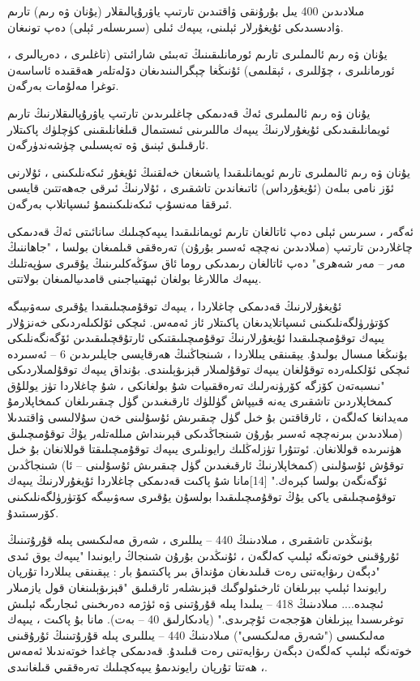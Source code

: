 \documentclass[a4paper]{article}
\begin{document}
مىلادىدىن 400 يىل بۇرۇنقى ۋاقتىدىن تارتىپ ياۋرۇپالىقلار (يۇنان ۋە رىم) تارىم ۋادىسىدىكى ئۇيغۇرلار ئېلىنى، يىپەك ئىلى (سىرىسلەر ئېلى) دەپ تونىغان.

يۇنان ۋە رىم ئالىملىرى تارىم ئورمانلىقىنىڭ تەبىئى شارائىتى (تاغلىرى ، دەريالىرى ، ئورمانلىرى ، چۆللىرى ، ئېقلىمى) ئۇنىڭغا چېگرالىنىدىغان دۆلەتلەر ھەققىدە ئاساسەن توغرا مەلۇمات بەرگەن.

يۇنان ۋە رىم ئالىملىرى ئەڭ قەدىمكى چاغلىرىدىن تارتىپ ياۋرۇپالىقلارنىڭ تارىم ئويمانلىقىدىكى ئۇيغۇرلارنىڭ يىپەك ماللىرىنى ئىستىمال قىلغانلىقىنى كۈچلۈك پاكىتلار ئارقىلىق ئېنىق ۋە تەپسىلىي چۈشەندۈرگەن.

يۇنان ۋە رىم ئالىملىرى تارىم ئويمانلىقىدا ياشىغان خەلقنىڭ ئۇيغۇر ئىكەنلىكىنى ، ئۇلارنى ئۆز نامى بىلەن (ئۇيغۇرداس) ئاتىغاندىن تاشقىرى ، ئۇلارنىڭ ئىرقى جەھەتتىن قايسى ئىرققا مەنسۇپ ئىكەنلىكىنىمۇ ئىسپاتلاپ بەرگەن.

ئەگەر ، سىرىس ئېلى دەپ ئاتالغان تارىم ئويمانلىقىدا يىپەكچىلىك سانائىتى ئەڭ قەدىمكى چاغلاردىن تارتىپ (مىلادىدىن نەچچە ئەسىر بۇرۇن) تەرەققى قىلمىغان بولسا ، "جاھاننىڭ مەر – مەر شەھرى" دەپ ئاتالغان رىمدىكى روما ئاق سۆڭەكلىرىنىڭ يۇقىرى سۈپەتلىك يىپەك ماللارغا بولغان ئېھتىياجىنى قامدىيالمىغان بولاتتى.

ئۇيغۇرلارنىڭ قەدىمكى چاغلاردا ، يىپەك توقۇمىچىلىقىدا يۇقىرى سەۋىيىگە كۆتۈرۈلگەنلىكىنى ئىسپاتلايدىغان پاكىتلار ئاز ئەمەس. ئىچكى ئۆلكىلەردىكى خەنزۇلار يىپەك توقۇمىچىلىقىدا ئۇيغۇرلارنىڭ توقۇمىچىلىقتىكى ئارتۇقچىلىقىدىن ئۆگەنگەنلىكى بۇنىڭغا مىسال بولىدۇ. يېقىنقى يىللاردا ، شىنجاڭنىڭ ھەرقايسى جايلىرىدىن 6 – ئەسىردە ئىچكى ئۆلكىلەردە توقۇلغان يىپەك توقۇلمىلار قېزىۋېلىندى. بۇنداق يىپەك توقۇلمىلاردىكى "نىسبەتەن كۆزگە كۆرۈنەرلىك تەرەققىيات شۇ بولغانكى ، شۇ چاغلاردا تۈز يوللۇق كىمخاپلاردىن تاشقىرى يەنە قىيپاش گۈللۈك ئارقىغىدىن گۈل چىقىرىلغان كىمخاپلارمۇ مەيدانغا كەلگەن ، ئارقاقتىن بۇ خىل گۈل چىقىرىش ئۇسۇلىنى خەن سۇلالىسى ۋاقتىدىلا (مىلادىدىن بىرنەچچە ئەسىر بۇرۇن شىنجاڭدىكى قېرىنداش مىللەتلەر يۇڭ توقۇمىچىلىق ھۈنىرىدە قوللانغان. ئوتتۇرا تۈزلەڭلىك رايونلىرى يىپەك توقۇمىچىلىقتا قوللانغان بۇ خىل توقۇش ئۇسۇلىنى (كىمخاپلارنىڭ ئارقىغىدىن گۈل چىقىرىش ئۇسۇلىنى – ئا) شىنجاڭدىن ئۆگەنگەن بولسا كېرەك." [14]مانا شۇ پاكىت قەدىمكى چاغلاردا ئۇيغۇرلارنىڭ يىپەك توقۇمىچىلىقى ياكى يۇڭ توقۇمىچىلىقىدا بولسۇن يۇقىرى سەۋىيىگە كۆتۈرۈلگەنلىكىنى كۆرسىتىدۇ.



بۇنىڭدىن تاشقىرى ، مىلادىنىڭ 440 – يىللىرى ، شەرق مەلىكىسى پىلە قۇرۇتىنىڭ ئۇرۇقىنى خوتەنگە ئېلىپ كەلگەن ، ئۇنىڭدىن بۇرۇن شىنجاڭ رايونىدا "يىپەك يوق ئىدى "دېگەن رىۋايەتنى رەت قىلىدىغان مۇنداق بىر پاكىتىمۇ بار : يېقىنقى يىللاردا تۇرپان رايونىدا ئېلىپ بېرىلغان ئارخىئولوگىك قېزىشلەر ئارقىلىق "قېزىۋېلىنغان قول يازمىلار ئىچىدە.... مىلادىنىڭ 418 – يىلىدا پىلە قۇرۇتىنى ۋە ئۈژمە دەرىخىنى ئىجارىگە ئېلىش توغرىسىدا يېزىلغان ھۆججەت ئۇچرىدى." (يادىكارلىق 40 – بەت). مانا بۇ پاكىت ، يىپەك مەلىكىسى ("شەرق مەلىكىسى") مىلادىنىڭ 440 – يىللىرى پىلە قۇرۇتىنىڭ ئۇرۇقىنى خوتەنگە ئېلىپ كەلگەن دېگەن رىۋايەتنى رەت قىلىدۇ. قەدىمكى چاغدا خوتەندىلا ئەمەس ، ھەتتا تۇرپان رايوندىمۇ يىپەكچىلىك تەرەققىي قىلغانىدى.
\end{document}
